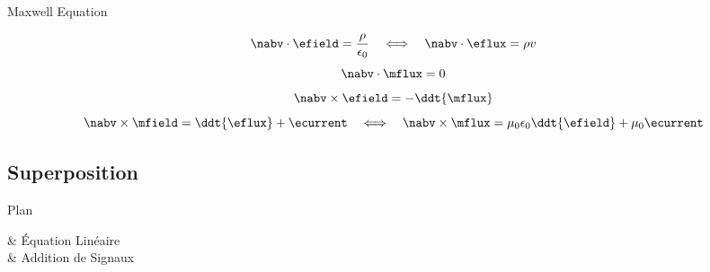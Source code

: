 \begin{frame}{Maxwell Equation}
    \begin{twocolumns}[0.3]
    \leftcol
    \rightcol
        \vspace{-8pt}
        \begin{equation}
                \nabv \cdot \efield = \frac{\rho}{\epsilon_0}
                \hspace{1em} \Longleftrightarrow \hspace{1.0em}
                \nabv \cdot \eflux = \rho v
        \end{equation}
        \vspace{-8pt}
        \begin{equation}
            \nabv \cdot \mflux = 0
        \end{equation}
        \vspace{-10pt}
        \begin{equation}
            \nabv \times \efield = -\ddt{\mflux}
        \end{equation}
        \vspace{-10pt}
        \begin{equation}
            \nabv \times \mfield = \ddt{\eflux} + \ecurrent
            \hspace{1em} \Longleftrightarrow \hspace{1.0em}
            \nabv \times \mflux = \mu_0 \epsilon_0 \ddt{\efield} + \mu_0 \ecurrent
        \end{equation}
 \end{twocolumns}
\end{frame}

\subsection[1min - Max]{Superposition }
\begin{frame}{Plan}
    \begin{makelist}[\small][1.5]
        \icon[red]{\faTimes} & Équation Linéaire\\
        \icon[red]{\faTimes} & Addition de Signaux
    \end{makelist}
\end{frame}

